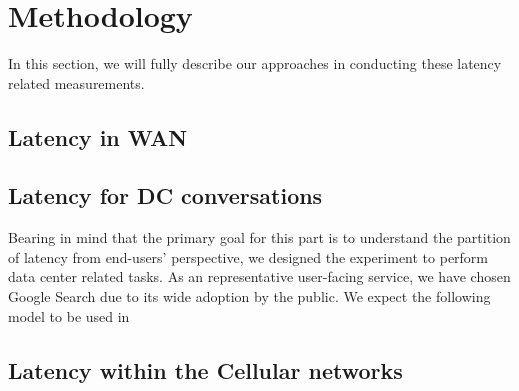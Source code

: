 
\section{Methodology}
\label{sec:methodology}
In this section, we will fully describe our approaches in conducting these latency related measurements.

\subsection{Latency in WAN}
\label{sec:latency-wan}

\subsection{Latency for DC conversations}
\label{sec:latency-dc-conv}
Bearing in mind that the primary goal for this part is to understand the partition of latency from end-users' perspective, we designed the experiment to perform data center related tasks. As an representative user-facing service, we have chosen Google Search due to its wide adoption by the public. We expect the following model to be used in 

\subsection{Latency within the Cellular networks}
\label{sec:latency-with-celull}



